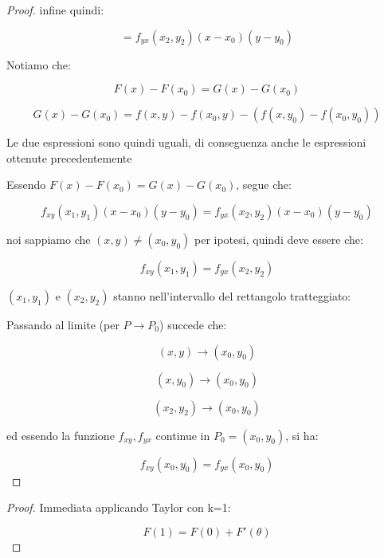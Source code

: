 \documentclass[11pt]{article}
\begin{document}
\begin{proof}
       infine quindi:

       \[
           = f_{yx}(x_2,y_2)(x-x_0)(y-y_0)
       \]


       Notiamo che:

       \[
           F(x) - F(x_0) = G(x) -G(x_0)
       \]

       \[
           G(x) - G(x_0) = f(x,y) - f(x_0,y) - (f(x,y_0) -f(x_0,y_0))
       \] 

       Le due espressioni sono quindi uguali, di conseguenza anche le espressioni ottenute precedentemente

       Essendo $F(x) - F(x_0) = G(x) - G(x_0)$, segue che:

       \[
           f_{xy}(x_1,y_1)(x-x_0)(y-y_0) = f_{yx}(x_2,y_2)(x-x_0)(y-y_0)
       \]

       noi sappiamo che $(x,y) \neq (x_0,y_0)$ per ipotesi, quindi deve essere che:

       \[
           f_{xy}(x_1,y_1) = f_{yx}(x_2,y_2)
       \]

       $(x_1,y_1)$ e $(x_2,y_2)$ stanno nell'intervallo del rettangolo tratteggiato:


       \begin{center}
       \end{center}

       Passando al limite (per $P \rightarrow P_0$) succede che:

       \[
           (x,y) \rightarrow (x_0,y_0)
       \]

       \[
           (x,y_0) \rightarrow (x_0,y_0)
       \]

       \[
           (x_2,y_2) \rightarrow (x_0,y_0)
       \]

       ed essendo la funzione $f_{xy},f_{yx}$ continue in $P_0=(x_0,y_0)$, si ha:

       \[
           f_{xy}(x_0,y_0) = f_{yx}(x_0,y_0)
       \]


\end{proof}
\newpage
\begin{proof}
       Immediata applicando Taylor con k=1:

       \[
           F(1) = F(0) + F'(\theta)
       \] 
\end{proof}
\end{document}
